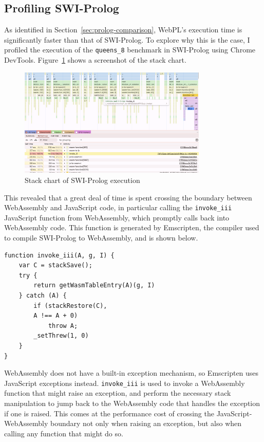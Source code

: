 \subsection{Profiling SWI-Prolog}

As identified in Section~\ref{sec:prolog-comparison}, WebPL's execution time is significantly faster than that of SWI-Prolog. To explore why this is the case, I profiled the execution of the \texttt{queens\_8} benchmark in SWI-Prolog using Chrome DevTools. Figure~\ref{fig:swi-prolog-profile} shows a screenshot of the stack chart.

\begin{figure}[H]
\centering
\includegraphics[width=0.8\textwidth]{08evaluation_swiprofiling.png}
\caption{Stack chart of SWI-Prolog execution}
\label{fig:swi-prolog-profile}
\end{figure}

This revealed that a great deal of time is spent crossing the boundary between WebAssembly and JavaScript code, in particular calling the \texttt{invoke\_iii} JavaScript function from WebAssembly, which promptly calls back into WebAssembly code. This function is generated by Emscripten, the compiler used to compile SWI-Prolog to WebAssembly, and is shown below.

\begin{center}
\begin{verbatim}
function invoke_iii(A, g, I) {
    var C = stackSave();
    try {
        return getWasmTableEntry(A)(g, I)
    } catch (A) {
        if (stackRestore(C),
        A !== A + 0)
            throw A;
        _setThrew(1, 0)
    }
}
\end{verbatim}
\end{center}

WebAssembly does not have a built-in exception mechanism, so Emscripten uses JavaScript exceptions instead. \texttt{invoke\_iii} is used to invoke a WebAssembly function that might raise an exception, and perform the necessary stack manipulation to jump back to the WebAssembly code that handles the exception if one is raised. This comes at the performance cost of crossing the JavaScript-WebAssembly boundary not only when raising an exception, but also when calling any function that might do so.

